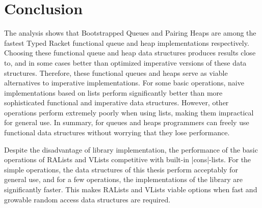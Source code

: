 \section{Conclusion}
The analysis shows that Bootstrapped Queues and Pairing Heaps are among
the fastest Typed Racket functional queue and heap implementations
respectively. Choosing these functional queue and heap data structures
produces results close to, and in some cases better than optimized
imperative versions of these data structures. Therefore, these
functional queues and heaps serve as viable alternatives to imperative
implementations. For some basic operations, naive implementations based
on lists perform significantly better than more sophisticated functional
and imperative data structures. However, other operations perform
extremely poorly when using lists, making them impractical for general
use. In summary, for queues and heaps programmers can freely use
functional data structures without worrying that they lose performance.

Despite the disadvantage of library implementation, the performance of
the basic operations of RALists and VLists competitive with built-in
\scheme|cons|-lists. For the simple operations, the data structures of
this thesis perform acceptably for general use, and for a few
operations, the implementations of the library are significantly
faster. This makes RALists and VLists viable options when fast and
growable random access data structures are required.


